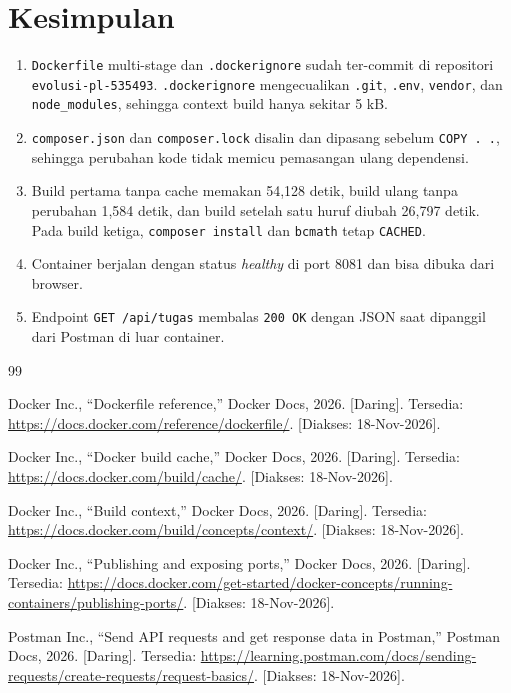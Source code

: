 \documentclass[a4paper,oneside,12pt]{report}
\begin{document}
\chapter{Kesimpulan}
\begin{enumerate}
    \item \texttt{Dockerfile} multi-stage dan \texttt{.dockerignore} sudah ter-commit di repositori \texttt{evolusi-pl-535493}. \texttt{.dockerignore} mengecualikan \texttt{.git}, \texttt{.env}, \texttt{vendor}, dan \texttt{node\_modules}, sehingga context build hanya sekitar 5 kB.
    \item \texttt{composer.json} dan \texttt{composer.lock} disalin dan dipasang sebelum \texttt{COPY . .}, sehingga perubahan kode tidak memicu pemasangan ulang dependensi.
    \item Build pertama tanpa cache memakan 54,128 detik, build ulang tanpa perubahan 1,584 detik, dan build setelah satu huruf diubah 26,797 detik. Pada build ketiga, \texttt{composer install} dan \texttt{bcmath} tetap \texttt{CACHED}.
    \item Container berjalan dengan status \textit{healthy} di port 8081 dan bisa dibuka dari browser.
    \item Endpoint \texttt{GET /api/tugas} membalas \texttt{200 OK} dengan JSON saat dipanggil dari Postman di luar container.
\end{enumerate}

\clearpage

\begin{thebibliography}{99}

Docker Inc., ``Dockerfile reference,'' Docker Docs, 2026. [Daring]. Tersedia: \url{https://docs.docker.com/reference/dockerfile/}. [Diakses: 18-Nov-2026].

Docker Inc., ``Docker build cache,'' Docker Docs, 2026. [Daring]. Tersedia: \url{https://docs.docker.com/build/cache/}. [Diakses: 18-Nov-2026].

Docker Inc., ``Build context,'' Docker Docs, 2026. [Daring]. Tersedia: \url{https://docs.docker.com/build/concepts/context/}. [Diakses: 18-Nov-2026].

Docker Inc., ``Publishing and exposing ports,'' Docker Docs, 2026. [Daring]. Tersedia: \url{https://docs.docker.com/get-started/docker-concepts/running-containers/publishing-ports/}. [Diakses: 18-Nov-2026].

Postman Inc., ``Send API requests and get response data in Postman,'' Postman Docs, 2026. [Daring]. Tersedia: \url{https://learning.postman.com/docs/sending-requests/create-requests/request-basics/}. [Diakses: 18-Nov-2026].

\end{thebibliography}
\end{document}
